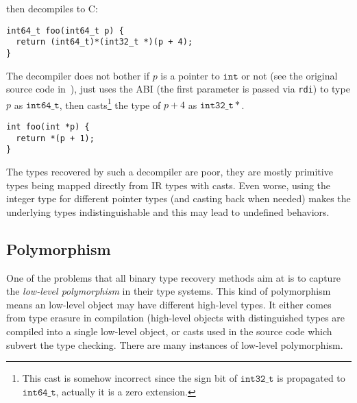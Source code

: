 \documentclass[compsoc,conference,a4paper,10pt,times]{IEEEtran}
\begin{document}
then decompiles to C:
\begin{lstlisting}[style={c},caption={Pointer increment then dereference (decompiled)},label={lst:derefdec}]
int64_t foo(int64_t p) {
  return (int64_t)*(int32_t *)(p + 4);
}
\end{lstlisting}
The decompiler does not bother if $p$ is a pointer to $\mathtt{int}$ or not (see the original source code in~), 
just uses the ABI 
(the first parameter is passed via \texttt{\small rdi}) to type $p$ as $\mathtt{int64\_t}$, 
then casts\footnote{This cast is somehow incorrect since the sign bit of 
$\mathtt{int32\_t}$ is propagated to $\mathtt{int64\_t}$, actually it is a zero extension.} the type of 
$p + 4$ as $\mathtt{int32\_t}*$.
\begin{lstlisting}[style={c},caption={Pointer increment then dereference (original)},label={lst:derefc}]
int foo(int *p) {
  return *(p + 1);
}
\end{lstlisting}
The types recovered by such a decompiler are poor, they are mostly primitive types being mapped directly from IR types 
with casts. Even worse, using the integer type for different pointer types (and casting back when needed) 
makes the underlying types indistinguishable and this may lead to undefined behaviors.



\subsection{Polymorphism}\label{subsec:polymorphism}
\noindent
One of the problems that all binary type recovery methods aim at is to capture the
\emph{low-level polymorphism} in their type systems. This kind of polymorphism means an
low-level object may have different high-level types. It either comes from 
\raisebox{.5pt}{\textcircled{\raisebox{-.9pt} {1}}} type erasure in
compilation (high-level objects with distinguished types are compiled into a
single low-level object, or \raisebox{.5pt}{\textcircled{\raisebox{-.9pt} {2}}} 
casts used in the source code which subvert the type checking. There are many 
instances of low-level polymorphism.
\end{document}
